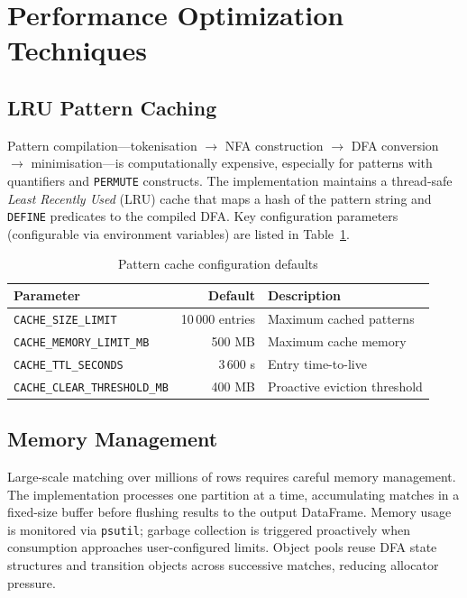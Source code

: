\section{Performance Optimization Techniques}
\label{sec:bg-performance}

\subsection{LRU Pattern Caching}
\label{subsec:bg-caching}

Pattern compilation---tokenisation $\to$ NFA construction $\to$ DFA
conversion $\to$ minimisation---is computationally expensive,
especially for patterns with quantifiers and \texttt{PERMUTE}
constructs.  The implementation maintains a thread-safe
\emph{Least Recently Used} (LRU) cache that maps a hash of the
pattern string and \texttt{DEFINE} predicates to the compiled DFA.
Key configuration parameters (configurable via environment
variables) are listed in Table~\ref{tab:bg-cache-config}.

\begin{table}[htbp]
  \centering
  \caption{Pattern cache configuration defaults}
  \label{tab:bg-cache-config}
  \begin{tabular}{lrl}
    \toprule
    \textbf{Parameter}         & \textbf{Default} & \textbf{Description} \\
    \midrule
    \texttt{CACHE\_SIZE\_LIMIT}        & 10\,000 entries  & Maximum cached patterns \\
    \texttt{CACHE\_MEMORY\_LIMIT\_MB}  & 500 MB           & Maximum cache memory \\
    \texttt{CACHE\_TTL\_SECONDS}       & 3\,600 s         & Entry time-to-live \\
    \texttt{CACHE\_CLEAR\_THRESHOLD\_MB} & 400 MB         & Proactive eviction threshold \\
    \bottomrule
  \end{tabular}
\end{table}

\subsection{Memory Management}
\label{subsec:bg-memory}

Large-scale matching over millions of rows requires careful memory
management.  The implementation processes one partition at a time,
accumulating matches in a fixed-size buffer before flushing results
to the output DataFrame.  Memory usage is monitored via
\texttt{psutil}; garbage collection is triggered proactively when
consumption approaches user-configured limits.  Object pools reuse
DFA state structures and transition objects across successive
matches, reducing allocator pressure.


